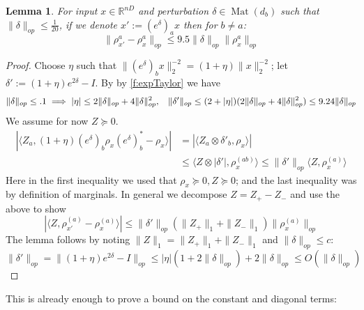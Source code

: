 \documentclass[aos]{imsart}
\newtheorem{lemma}[theorem]{Lemma}
\theoremstyle{definition}
\numberwithin{equation}{section}
\DeclareMathOperator{\Mat}{Mat}
\newcommand{\R}{{\mathbb{R}}}
\newcommand{\samp}{x}
\newcommand{\CF}[1]{{\color{purple}[CF: #1]}}
\newcommand{\AR}[1]{{\color{orange}[AR: #1]}}
\begin{document}
\begin{appendix}
\begin{lemma} \label{btoaaRobustness}
For input $\samp \in \R^{nD}$ and perturbation $\delta \in \Mat(d_{b})$ such that $\|\delta\|_{op} \leq \frac{1}{20}$, if we denote $\samp' := (e^{\delta})_{a} \samp$ then for $b \neq a$:
\[ \|\rho_{\samp'}^{a} - \rho_{\samp}^{a}\|_{op} \leq 9.5 \|\delta\|_{op} \|\rho_{\samp}^{a}\|_{op}      \]
\end{lemma}
\begin{proof}
Choose $\eta$ such that $\|(e^{\delta})_{b} \samp\|_{2}^{-2} = (1+\eta) \|\samp\|_{2}^{-2}$; let $\delta' := (1+\eta)e^{2\delta} - I$. By by \cref{f:expTaylor} we have
\[ \|\delta\|_{op} \leq .1 \implies |\eta| \leq 2\|\delta\|_{op} + 4\|\delta\|_{op}^{2}, \hspace{3mm} \|\delta'\|_{op} \leq (2+|\eta|)(2\|\delta\|_{op} + 4\|\delta\|_{op}^{2}) \leq 9.24 \|\delta\|_{op} \]
We assume for now $Z \succeq 0$.
\begin{align*} | \langle Z_{a}, (1+\eta) (e^{\delta})_{b} \rho_{\samp} (e^{\delta})_{b}^{*} - \rho_{\samp} \rangle|
& = | \langle Z_{a} \otimes \delta'_{b}, \rho_{\samp} \rangle   |  \\
&\leq \langle Z \otimes |\delta'|, \rho_{\samp}^{(ab)} \rangle
\leq \|\delta'\|_{op} \langle Z, \rho_{\samp}^{(a)} \rangle
\end{align*}
Here in the first inequality we used that $\rho_{\samp} \succeq 0, Z \succeq 0$; and the last inequality was by definition of marginals.
In general we decompose $Z = Z_{+} - Z_{-}$ and use the above to show
\[ |\langle Z, \rho_{\samp'}^{(a)} - \rho_{\samp}^{(a)} \rangle| \leq \|\delta'\|_{op} (\|Z_{+}\|_{1} + \|Z_{-}\|_{1}) \|\rho_{\samp}^{(a)}\|_{op}     \]
The lemma follows by noting $\|Z\|_{1} = \|Z_{+}\|_{1} + \|Z_{-}\|_{1}$ and $\|\delta\|_{op} \leq c$:
\[ \|\delta'\|_{op} = \|(1+\eta) e^{2 \delta} - I\|_{op} \leq |\eta|(1 + 2 \|\delta\|_{op}) + 2\|\delta\|_{op} \leq O(\|\delta\|_{op})  \]
\end{proof}

This is already enough to prove a bound on the constant and diagonal terms:


\end{appendix}
\end{document}

